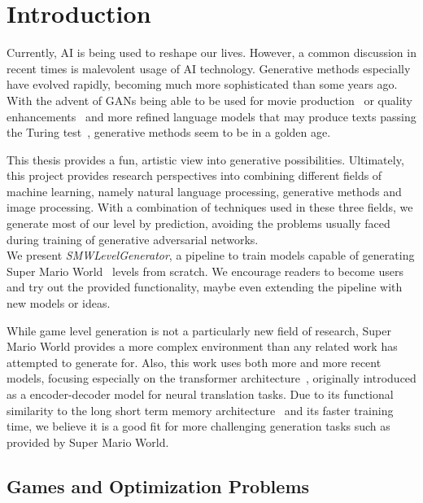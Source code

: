 \section{Introduction}

Currently, AI is being used to reshape our lives. However, a common
discussion in recent times is malevolent usage of AI technology.
Generative methods especially have evolved rapidly, becoming much more
sophisticated than some years ago. With the advent of GANs being able
to be used for movie production~\cite{Face2FaceRealtimeFace} or
quality enhancements~\cite{wangESRGANEnhancedSuperResolution2018} and
more refined language models that may produce texts passing the Turing
test~\cite{TuringTest2019,radfordLanguageModelsAre}, generative
methods seem to be in a golden age.

This thesis provides a fun, artistic view into generative
possibilities. Ultimately, this project provides research perspectives
into combining different fields of machine learning, namely natural
language processing, generative methods and image processing. With a
combination of techniques used in these three fields, we generate most
of our level by prediction, avoiding the problems usually faced during
training of generative adversarial networks. \\
We present \emph{SMWLevelGenerator}, a pipeline to train models
capable of generating Super Mario World~\cite{SuperMarioWorld2019}
levels from scratch. We encourage readers to become users and try out
the provided functionality, maybe even extending the pipeline with new
models or ideas.

While game level generation is not a particularly new field of
research, Super Mario World provides a more complex environment than
any related work has attempted to generate for. Also, this work uses
both more and more recent models, focusing especially on the
transformer architecture~\cite{vaswaniAttentionAllYou2017}, originally
introduced as a encoder-decoder model for neural translation tasks.
Due to its functional similarity to the long short term memory
architecture~\cite{hochreiterLongShorttermMemory1997} and its faster
training time, we believe it is a good fit for more challenging
generation tasks such as provided by Super Mario World.

\subsection{Games and Optimization Problems}

